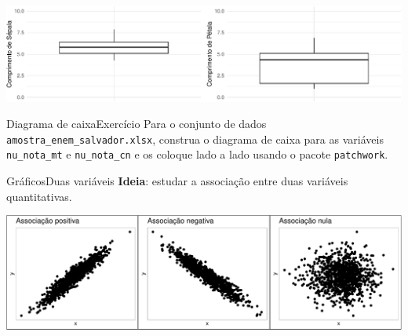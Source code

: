 \documentclass[
  10pt,
  ignorenonframetext,
]{beamer}
\begin{document}
\begin{frame}
\begin{center}\includegraphics[width=1\linewidth]{aulas_files/figure-beamer/unnamed-chunk-71-1} \end{center}
\end{frame}

\begin{frame}[fragile]{Diagrama de caixa\newline Exercício}
\protect\hypertarget{diagrama-de-caixaexercuxedcio}{}
Para o conjunto de dados \texttt{amostra\_enem\_salvador.xlsx}, construa
o diagrama de caixa para as variáveis \texttt{nu\_nota\_mt} e
\texttt{nu\_nota\_cn} e os coloque lado a lado usando o pacote
\texttt{patchwork}.
\end{frame}

\begin{frame}{Gráficos\newline Duas variáveis}
\protect\hypertarget{gruxe1ficosduas-variuxe1veis}{}
\textbf{Ideia}: estudar a associação entre duas variáveis quantitativas.

\begin{center}\includegraphics[width=0.75\linewidth]{aulas_files/figure-beamer/unnamed-chunk-72-1} \end{center}
\end{frame}
\end{document}
